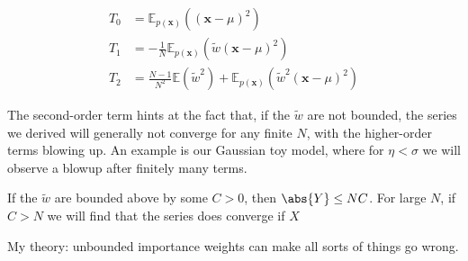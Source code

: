 \documentclass[10pt,english]{article}
\newcommand{\E}{\mathbb{E}}
\newcommand{\mathbold}[1]{\ensuremath{\boldsymbol{\mathbf{#1}}}}
\newcommand{\bx}{\mathbold{x}}
\newcommand{\px}{{p(\bx)}}
\begin{document}
\begin{align*}
T_0 &= \E_\px\left((\bx - \mu)^2 \right) \\
T_1 &= -\frac 1 N \E_\px\left(\tilde w(\bx - \mu)^2 \right) \\
T_2 &= \frac {N - 1}{N^2} \E(\tilde w^2) + \E_\px\left(\tilde w^2 (\bx - \mu)^2 \right)
\end{align*}

\noindent The second-order term hints at the fact that, if the $\tilde w$ are not bounded, the series we derived will generally not converge for any finite $N$, with the higher-order terms blowing up. An example is our Gaussian toy model, where for $\eta < \sigma$ we will observe a blowup after finitely many terms.

If the $\tilde w$ are bounded above by some $C > 0$, then $\abs{Y} \leq NC$. For large $N$, if $C > N$ we will find that the series does converge if $X$

My theory: unbounded importance weights can make all sorts of things go wrong.
\end{document}
